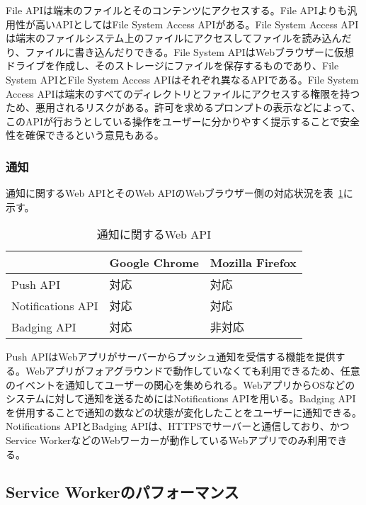 File APIは端末のファイルとそのコンテンツにアクセスする。File APIよりも汎用性が高いAPIとしてはFile System Access APIがある。File System Access APIは端末のファイルシステム上のファイルにアクセスしてファイルを読み込んだり、ファイルに書き込んだりできる。File System APIはWebブラウザーに仮想ドライブを作成し、そのストレージにファイルを保存するものであり、File System APIとFile System Access APIはそれぞれ異なるAPIである。File System Access APIは端末のすべてのディレクトリとファイルにアクセスする権限を持つため、悪用されるリスクがある。許可を求めるプロンプトの表示などによって、このAPIが行おうとしている操作をユーザーに分かりやすく提示することで安全性を確保できるという意見もある。

\subsubsection{通知}\label{subsubsection:通知}
通知に関するWeb APIとそのWeb APIのWebブラウザー側の対応状況を表~\ref{table:通知に関するWeb API}に示す。
\begin{table}
  \centering
  \begin{tabular}{|p{20em}|p{10em}|p{10em}|}
    \hline
    & Google Chrome & Mozilla Firefox \\ \hline
    Push API & 対応 & 対応 \\ \hline
    Notifications API & 対応 & 対応 \\ \hline
    Badging API & 対応 & 非対応 \\ \hline
  \end{tabular}
  \caption{通知に関するWeb API}\label{table:通知に関するWeb API}
\end{table}

Push APIはWebアプリがサーバーからプッシュ通知を受信する機能を提供する。Webアプリがフォアグラウンドで動作していなくても利用できるため、任意のイベントを通知してユーザーの関心を集められる。WebアプリからOSなどのシステムに対して通知を送るためにはNotifications APIを用いる。Badging APIを併用することで通知の数などの状態が変化したことをユーザーに通知できる。Notifications APIとBadging APIは、HTTPSでサーバーと通信しており、かつService WorkerなどのWebワーカーが動作しているWebアプリでのみ利用できる。

\subsection{Service Workerのパフォーマンス}\label{subsection:Service Workerのパフォーマンス}
